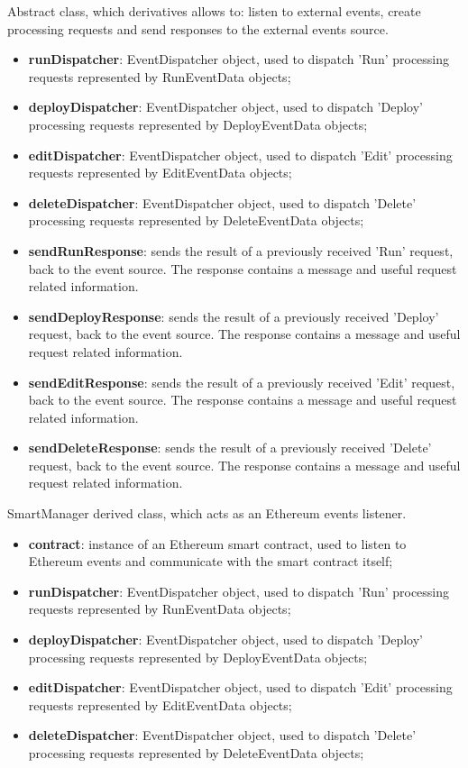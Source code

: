 	Abstract class, which derivatives allows to: listen to external events, create processing requests and send responses to the external events source.
	\begin{itemize}
		\item \textbf{runDispatcher}: EventDispatcher object, used to dispatch 'Run' processing requests represented by RunEventData objects;
		\item \textbf{deployDispatcher}: EventDispatcher object, used to dispatch 'Deploy' processing requests represented by DeployEventData objects;
		\item \textbf{editDispatcher}: EventDispatcher object, used to dispatch 'Edit' processing requests represented by EditEventData objects;
		\item \textbf{deleteDispatcher}: EventDispatcher object, used to dispatch 'Delete' processing requests represented by DeleteEventData objects;
	\end{itemize}
	\begin{itemize}
		\item \textbf{sendRunResponse}: sends the result of a previously received 'Run' request, back to the event source. The response contains a message and useful request related information.
		\item \textbf{sendDeployResponse}: sends the result of a previously received 'Deploy' request, back to the event source. The response contains a message and useful request related information.
		\item \textbf{sendEditResponse}: sends the result of a previously received 'Edit' request, back to the event source. The response contains a message and useful request related information.
		\item \textbf{sendDeleteResponse}: sends the result of a previously received 'Delete' request, back to the event source. The response contains a message and useful request related information.
	\end{itemize}
	SmartManager derived class, which acts as an Ethereum events listener.
	\begin{itemize}
		\item \textbf{contract}: instance of an Ethereum smart contract, used to listen to Ethereum events and communicate with the smart contract itself;
		\item \textbf{runDispatcher}: EventDispatcher object, used to dispatch 'Run' processing requests represented by RunEventData objects;
		\item \textbf{deployDispatcher}: EventDispatcher object, used to dispatch 'Deploy' processing requests represented by DeployEventData objects;
		\item \textbf{editDispatcher}: EventDispatcher object, used to dispatch 'Edit' processing requests represented by EditEventData objects;
		\item \textbf{deleteDispatcher}: EventDispatcher object, used to dispatch 'Delete' processing requests represented by DeleteEventData objects;
	\end{itemize}
